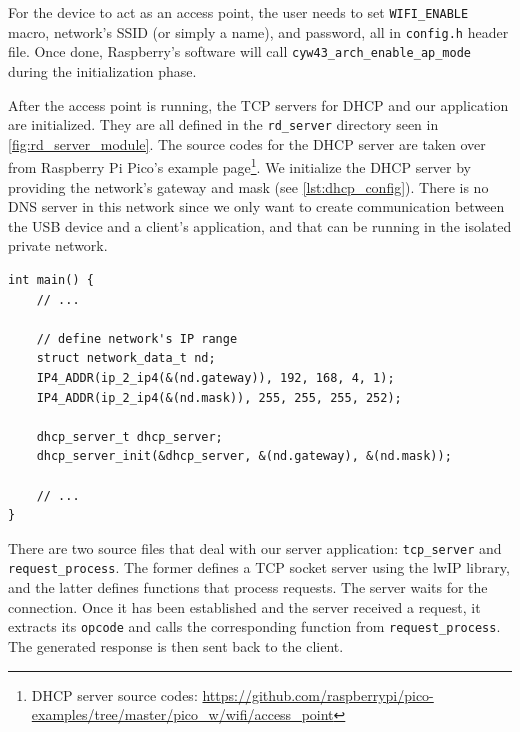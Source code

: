 For the device to act as an access point, the user needs to set \verb|WIFI_ENABLE| macro, network's SSID (or simply a name), and password, all in \verb|config.h| header file. Once done, Raspberry's software will call \verb|cyw43_arch_enable_ap_mode| during the initialization phase.

After the access point is running, the TCP servers for DHCP and our application are initialized. They are all defined in the \verb|rd_server| directory seen in \autoref{fig:rd_server_module}. The source codes for the DHCP server are taken over from Raspberry Pi Pico's example page\footnote{DHCP server source codes: \url{https://github.com/raspberrypi/pico-examples/tree/master/pico_w/wifi/access_point}}. We initialize the DHCP server by providing the network's gateway and mask (see \autoref{lst:dhcp_config}). There is no DNS server in this network since we only want to create communication between the USB device and a client's application, and that can be running in the isolated private network.

\begin{lstlisting}
int main() {
    // ...

    // define network's IP range
    struct network_data_t nd;
    IP4_ADDR(ip_2_ip4(&(nd.gateway)), 192, 168, 4, 1);
    IP4_ADDR(ip_2_ip4(&(nd.mask)), 255, 255, 255, 252);

    dhcp_server_t dhcp_server;
    dhcp_server_init(&dhcp_server, &(nd.gateway), &(nd.mask));

    // ...
}
\end{lstlisting}

There are two source files that deal with our server application: \verb|tcp_server| and \verb|request_process|. The former defines a TCP socket server using the lwIP library, and the latter defines functions that process requests. The server waits for the connection. Once it has been established and the server received a request, it extracts its \verb|opcode| and calls the corresponding function from \verb|request_process|. The generated response is then sent back to the client.


